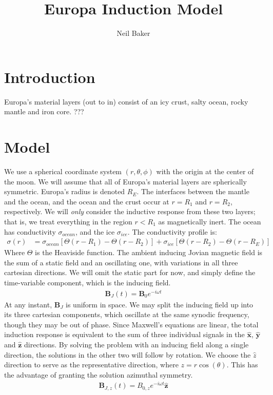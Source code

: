 \documentclass{article}
\title{Europa Induction Model}
\author{Neil Baker}
\begin{document}
\maketitle

\section{Introduction}
Europa's material layers (out to in) consist of an icy crust, salty ocean, rocky mantle and iron core. ???

\section{Model}
We use a spherical coordinate system $(r,\theta,\phi)$ with the origin at the center of the moon. We will assume that all of Europa's material layers are spherically symmetric. Europa's radius is denoted $R_E$. The interfaces between the mantle and the ocean, and the ocean and the crust occur at $r=R_1$ and $r=R_2$, respectively. We will \textit{only} consider the inductive response from these two layers; that is, we treat everything in the region $r<R_1$ as magnetically inert. The ocean has conductivity $\sigma_{ocean}$, and the ice $\sigma_{ice}$. The conductivity profile is:
\begin{align}
    \sigma(r) &= \sigma_{ocean}[\Theta(r-R_1)-\Theta(r-R_2)] + \sigma_{ice}[\Theta(r-R_2)-\Theta(r-R_E)]
\end{align}
Where $\Theta$ is the Heaviside function. The ambient inducing Jovian magnetic field is the sum of a static field and an oscillating one, with variations in all three cartesian directions. We will omit the static part for now, and simply define the time-variable component, which is the inducing field.
\begin{align}
    \mathbf{B}_J(t) = \mathbf{B}_{0}e^{-i\omega t}
\end{align}
At any instant, $\mathbf{B}_J$ is uniform in space. We may split the inducing field up into its three cartesian components, which oscillate at the same synodic frequency, though they may be out of phase. Since Maxwell's equations are linear, the total induction response is equivalent to the sum of three individual signals in the $\mathbf{\hat{x}}$, $\mathbf{\hat{y}}$ and $\mathbf{\hat{z}}$ directions. By solving the problem with an inducing field along a single direction, the solutions in the other two will follow by rotation. We choose the $\hat{z}$ direction to serve as the representative direction, where $z=r\cos(\theta)$. This has the advantage of granting the solution azimuthal symmetry.
\begin{align}
    \mathbf{B}_{J,z}(t) = B_{0,z}e^{-i\omega t}\mathbf{\hat{z}}
\end{align}
\end{document}
